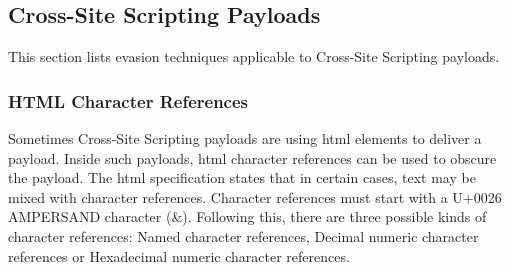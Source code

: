 \subsection{Cross-Site Scripting Payloads}
\label{sec:xsstech}
This section lists evasion techniques applicable to Cross-Site Scripting payloads.

%
%
%
%
%

\subsubsection{HTML Character References}
\label{sec:htmlcharreftech}
Sometimes Cross-Site Scripting payloads are using \acrfull{html} elements to deliver a payload. Inside such payloads, \acrshort{html} character references can be used to obscure the payload. The \acrshort{html} specification states that in certain cases, text may be mixed with character references. Character references must start with a U+0026 AMPERSAND character (\&). Following this, there are three possible kinds of character references: Named character references, Decimal numeric character references or Hexadecimal numeric character references. \cite{www/html}

